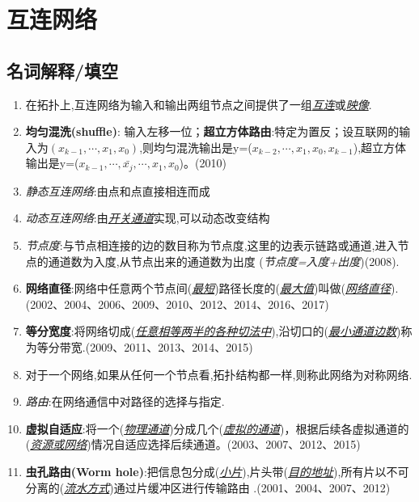 \documentclass[a4paper]{ctexart}
\newcommand{\blank}[1]{(\emph{\underline{#1}})}
\begin{document}
\newpage
\section{互连网络}
\subsection{名词解释/填空}
\begin{enumerate}
  \item 在拓扑上,互连网络为输入和输出两组节点之间提供了一组\emph{\underline{互连}}或\emph{\underline{映像}}.
  \item \textbf{均匀混洗(shuffle)}: 输入左移一位；\textbf{超立方体路由}:特定为置反；设互联网的输入为$(x_{k-1},\cdots,x_1,x_0)$,则均匀混洗输出是y=\blank{$x_{k-2},\cdots,x_1,x_0,x_{k-1}$},超立方体输出是y=\blank{$x_{k-1},\cdots,\bar{x_j},\cdots,x_1,x_0$}。(2010)
  \item \emph{静态互连网络}:由点和点直接相连而成
  \item \emph{动态互连网络}:由\underline{\emph{开关通道}}实现,可以动态改变结构
  \item \emph{节点度}:与节点相连接的边的数目称为节点度,这里的边表示链路或通道,进入节点的通道数为入度,从节点出来的通道数为出度
  (\emph{节点度=入度+出度})(2008).
  \item \textbf{网络直径}:网络中任意两个节点间\blank{最短}路径长度的\blank{最大值}叫做(\emph{\underline{网络直径}}).(2002、2004、2006、2009、2010、2012、2014、2016、2017)
  \item \textbf{等分宽度}:将网络切成\blank{任意相等两半的各种切法中},沿切口的\blank{最小通道边数}称为等分带宽.(2009、2011、2013、2014、2015)
  \item 对于一个网络,如果从任何一个节点看,拓扑结构都一样,则称此网络为对称网络.
  \item \emph{路由}:在网络通信中对路径的选择与指定.
  \item \textbf{虚拟自适应}:将一个\blank{物理通道}分成几个\blank{虚拟的通道}，根据后续各虚拟通道的\blank{资源或网络}情况自适应选择后续通道。(2003、2007、2012、2015)
  \item \textbf{虫孔路由(Worm hole)}:把信息包分成(\emph{\underline{小片}}),片头带(\emph{\underline{目的地址}}),所有片以不可分离的(\emph{\underline{流水方式}})通过片缓冲区进行传输路由 .(2001、2004、2007、2012)
\end{enumerate}
\end{document}
